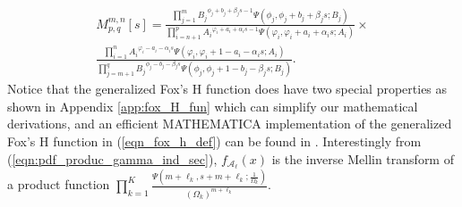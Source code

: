 \documentclass[12pt,onecolumn,draftcls]{IEEEtran}
\newcommand{\bs}{\boldsymbol}
\begin{document}
\begin{multline}\label{eqn:def_M}
M_{p,q}^{m,n}\left[ s \right] = \frac{{\prod\nolimits_{j = 1}^m {{B_j}^{{\phi _j} + {b_j} + {\beta _j}s - 1}\Psi \left( {{\phi _j},{\phi _j} + {b_j} + {\beta _j}s;{B_j}} \right)} }}{{\prod\nolimits_{i = n + 1}^p {{ A_i}^{{\varphi _i} + {a_i} + {\alpha _i}s - 1}\Psi \left( {{\varphi _i},{\varphi _i} + {a_i} + {\alpha _i}s;{ A_i}} \right)} }}\times \\
\frac{{\prod\nolimits_{i = 1}^n {{ A_i}^{{\varphi _i} - {a_i} - {\alpha _i}s}\Psi \left( {{\varphi _i},{\varphi _i} + 1 - {a_i} - {\alpha _i}s;{ A_i}} \right)} }}{{\prod\nolimits_{j = m + 1}^q {{B_j}^{{\phi _j} - {b_j} - {\beta _j}s}\Psi \left( {{\phi _j},{\phi _j} + 1 - {b_j} - {\beta _j}s;{B_j}} \right)} }}.
\end{multline}
Notice that the generalized Fox's H function does have two special properties as shown in Appendix \ref{app:fox_H_fun} which can simplify our mathematical derivations, and an efficient MATHEMATICA{\textregistered} implementation of the generalized Fox's H function in (\ref{eqn_fox_h_def}) can be found in \cite{yilmaz2010outage}. Interestingly from (\ref{eqn:pdf_produc_gamma_ind_sec}), $f_{{\mathcal A}_{\bs{\ell}}}(x)$ is the inverse Mellin transform of a product function $\prod\nolimits_{k = 1}^K {\frac{{\Psi \left( {m + {\ell_k},s + m + {\ell_k};\frac{1}{{{\Omega _k}}}} \right)}}{{{{\left( {{\Omega _k}} \right)}^{m + {\ell_k}}}}}}$.
\end{document}
